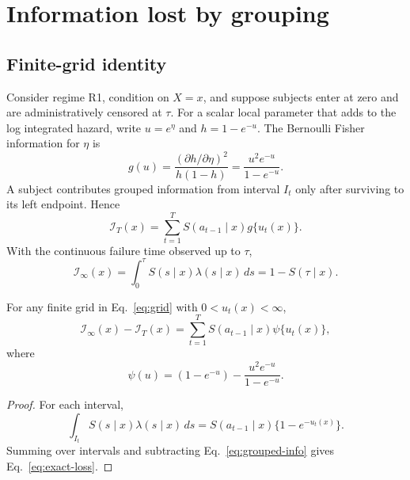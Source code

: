 \documentclass[smallextended,natbib]{svjour3}
\begin{document}
\section{Information lost by grouping}
\label{sec:information}

\subsection{Finite-grid identity}
\label{sec:information-exact}

Consider regime R1, condition on $X=x$, and suppose subjects enter at zero and are administratively censored at $\tau$. For a scalar local parameter that adds to the log integrated hazard, write $u=e^\eta$ and $h=1-e^{-u}$. The Bernoulli Fisher information for $\eta$ is \citep{vanderVaart1998}
\begin{equation}
g(u)=\frac{(\partial h/\partial\eta)^2}{h(1-h)}
    =\frac{u^2e^{-u}}{1-e^{-u}}.
\label{eq:g-info}
\end{equation}
A subject contributes grouped information from interval $I_t$ only after surviving to its left endpoint. Hence
\begin{equation}
\mathcal I_T(x)=\sum_{t=1}^T S(a_{t-1}\mid x)g\{u_t(x)\}.
\label{eq:grouped-info}
\end{equation}
With the continuous failure time observed up to $\tau$,
\begin{equation}
\mathcal I_\infty(x)=\int_0^\tau S(s\mid x)\lambda(s\mid x)\,ds
=1-S(\tau\mid x).
\label{eq:continuous-info}
\end{equation}

\begin{lemma}
\label{lem:exact}
For any finite grid in Eq.~\eqref{eq:grid} with $0<u_t(x)<\infty$,
\begin{equation}
\mathcal I_\infty(x)-\mathcal I_T(x)
=
\sum_{t=1}^T S(a_{t-1}\mid x)\psi\{u_t(x)\},
\label{eq:exact-loss}
\end{equation}
where
\begin{equation}
\psi(u)=(1-e^{-u})-\frac{u^2e^{-u}}{1-e^{-u}}.
\label{eq:psi}
\end{equation}
\end{lemma}

\begin{proof}
For each interval,
\begin{equation}
\int_{I_t}S(s\mid x)\lambda(s\mid x)\,ds
=S(a_{t-1}\mid x)\{1-e^{-u_t(x)}\}.
\end{equation}
Summing over intervals and subtracting Eq.~\eqref{eq:grouped-info} gives Eq.~\eqref{eq:exact-loss}.
\end{proof}
\end{document}

